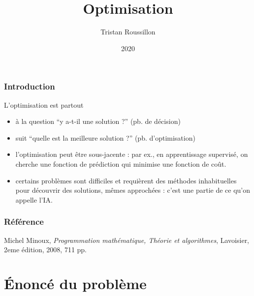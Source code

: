 \documentclass{beamer}
\title[]
 {Optimisation}
\author[T. Roussillon]
 {Tristan Roussillon}
\date{2020}
\institute{INSA Lyon, TC}
\begin{document}
\begin{frame}
  \titlepage
\end{frame}

\begin{frame}
  \frametitle{Introduction}

  \begin{block}{L'optimisation est partout}
  \begin{itemize}
  \item à la question ``y a-t-il une solution ?'' (pb. de décision)
  \item suit ``quelle est la meilleure solution ?'' (pb. d'optimisation)
  \item l'optimisation peut être sous-jacente : par ex., en apprentissage supervisé, on cherche
    une fonction de prédiction qui minimise une fonction de coût.
  \item certains problèmes sont difficiles et requièrent des méthodes inhabituelles pour découvrir
    des solutions, mêmes approchées : c'est une partie de ce qu'on appelle l'IA.
  \end{itemize}
  \end{block}
  
\end{frame}


\begin{frame}
  \frametitle{Référence}

\begin{thebibliography}{alpha}
Michel Minoux, \emph{Programmation mathématique, Théorie et algorithmes}, Lavoisier, 2eme édition, 2008, 711 pp.
\end{thebibliography}

\end{frame}

\section{\'Enoncé du problème}
\end{document}
